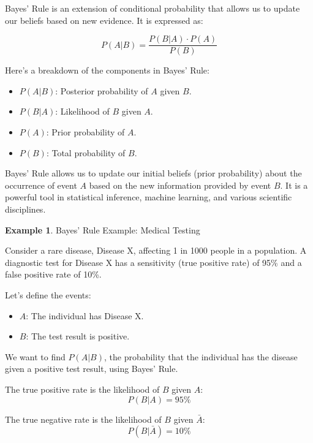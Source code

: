\documentclass[12pt]{book}
\theoremstyle{definition}
\newtheorem{exmp}{Example}[chapter]
\begin{document}
Bayes' Rule is an extension of conditional probability that allows us to update our beliefs based on new evidence. It is expressed as:

\begin{equation}
    P(A | B) = \frac{P(B | A) \cdot P(A)}{P(B)}
\end{equation}

Here's a breakdown of the components in Bayes' Rule:

\begin{itemize}
    \item $P(A | B)$: Posterior probability of $A$ given $B$.
    \item $P(B | A)$: Likelihood of $B$ given $A$.
    \item $P(A)$: Prior probability of $A$.
    \item $P(B)$: Total probability of $B$.
\end{itemize}

Bayes' Rule allows us to update our initial beliefs (prior probability) about the occurrence of event $A$ based on the new information provided by event $B$. It is a powerful tool in statistical inference, machine learning, and various scientific disciplines.


\begin{tcolorbox}
\begin{exmp}{Bayes' Rule Example: Medical Testing}

Consider a rare disease, Disease X, affecting 1 in 1000 people in a population. A diagnostic test for Disease X has a sensitivity (true positive rate) of 95\% and a false positive rate of 10\%.

Let's define the events:
\begin{itemize}
    \item $A$: The individual has Disease X.
    \item $B$: The test result is positive.
\end{itemize}

We want to find $P(A | B)$, the probability that the individual has the disease given a positive test result, using Bayes' Rule.

\end{exmp}
\end{tcolorbox}

The true positive rate is the likelihood of $B$ given $A$: 
\[
P(B|A) = 95\%
\]

The true negative rate is the likelihood of $B$ given $\bar{A}$: 
\[
P(B|\bar{A}) = 10\%
\]
\end{document}
